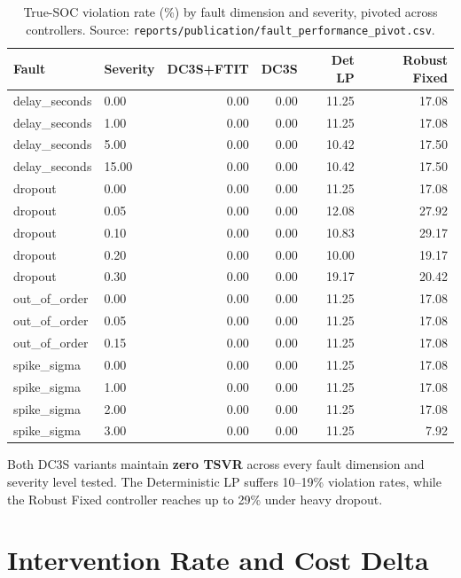 \begin{table}[ht]
\centering
\caption{True-SOC violation rate (\%) by fault dimension and severity,
  pivoted across controllers.  Source: \texttt{reports/publication/fault\_performance\_pivot.csv}.}
\label{tab:fault-stress}
\small
\begin{tabular}{llrrrr}
\toprule
\textbf{Fault} & \textbf{Severity} & \textbf{DC3S+FTIT} & \textbf{DC3S} &
  \textbf{Det LP} & \textbf{Robust Fixed} \\
\midrule
delay\_seconds & 0.00  & 0.00 & 0.00 & 11.25 & 17.08 \\
delay\_seconds & 1.00  & 0.00 & 0.00 & 11.25 & 17.08 \\
delay\_seconds & 5.00  & 0.00 & 0.00 & 10.42 & 17.50 \\
delay\_seconds & 15.00 & 0.00 & 0.00 & 10.42 & 17.50 \\
\midrule
dropout & 0.00 & 0.00 & 0.00 & 11.25 & 17.08 \\
dropout & 0.05 & 0.00 & 0.00 & 12.08 & 27.92 \\
dropout & 0.10 & 0.00 & 0.00 & 10.83 & 29.17 \\
dropout & 0.20 & 0.00 & 0.00 & 10.00 & 19.17 \\
dropout & 0.30 & 0.00 & 0.00 & 19.17 & 20.42 \\
\midrule
out\_of\_order & 0.00 & 0.00 & 0.00 & 11.25 & 17.08 \\
out\_of\_order & 0.05 & 0.00 & 0.00 & 11.25 & 17.08 \\
out\_of\_order & 0.15 & 0.00 & 0.00 & 11.25 & 17.08 \\
\midrule
spike\_sigma & 0.00 & 0.00 & 0.00 & 11.25 & 17.08 \\
spike\_sigma & 1.00 & 0.00 & 0.00 & 11.25 & 17.08 \\
spike\_sigma & 2.00 & 0.00 & 0.00 & 11.25 & 17.08 \\
spike\_sigma & 3.00 & 0.00 & 0.00 & 11.25 &  7.92 \\
\bottomrule
\end{tabular}
\end{table}

Both DC3S variants maintain \textbf{zero TSVR} across every fault
dimension and severity level tested.  The Deterministic LP suffers
10--19\% violation rates, while the Robust Fixed controller reaches
up to 29\% under heavy dropout.

\section{Intervention Rate and Cost Delta}

